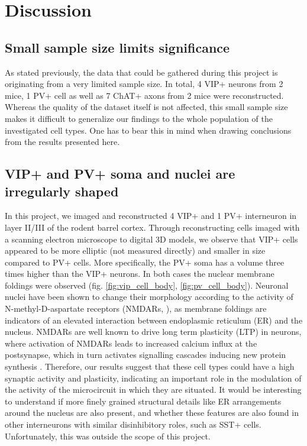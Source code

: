 \chapter{Discussion}
\label{ch:discussion}
\section{Small sample size limits significance}
As stated previously, the data that could be gathered during this project is originating from a very limited sample size. In total, 4 VIP+ neurons from 2 mice, 1 PV+ cell as well as 7 ChAT+ axons from 2 mice were reconstructed. Whereas the quality of the dataset itself is not affected, this small sample size makes it difficult to generalize our findings to the whole population of the investigated cell types. One has to bear this in mind when drawing conclusions from the results presented here.
\section{VIP+ and PV+ soma and nuclei are irregularly shaped}
\label{sec:vip_pv_nuclei}
In this project, we imaged and reconstructed 4 VIP+ and 1 PV+ interneuron in layer II/III of the rodent barrel cortex. Through reconstructing cells imaged with a scanning electron microscope to digital 3D models, we observe that VIP+ cells appeared to be more elliptic (not measured directly) and smaller in size compared to PV+ cells. More specifically, the PV+ soma has a volume three times higher than the VIP+ neurons. In both cases the nuclear membrane foldings were observed (fig. \ref{fig:vip_cell_body}, \ref{fig:pv_cell_body}). Neuronal nuclei have been shown to change their morphology according to the activity of N-methyl-D-aspartate receptors (NMDARs, \cite{Wittmann2009}), as membrane foldings are indicators of an elevated interaction between endoplasmic reticulum (ER) and the nucleus. NMDARs are well known to drive long term plasticity (LTP) in neurons, where activation of NMDARs leads to increased calcium influx at the postsynapse, which in turn activates signalling cascades inducing new protein synthesis \citep{Malenka1991}. Therefore, our results suggest that these cell types could have a high synaptic activity and plasticity, indicating an important role in the modulation of the activity of the microcircuit in which they are situated. It would be interesting to understand if more finely grained structural details like ER arrangements around the nucleus are also present, and whether these features are also found in other interneurons with similar disinhibitory roles, such as SST+ cells. Unfortunately, this was outside the scope of this project.  
